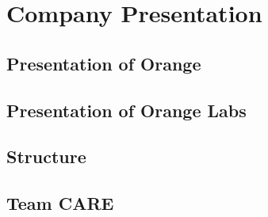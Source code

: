 
\chapter{Company Presentation} %

\label{Chapter2} %




\section{Presentation of Orange}



\section{Presentation of Orange Labs}

\section{Structure}

\section{Team CARE}


